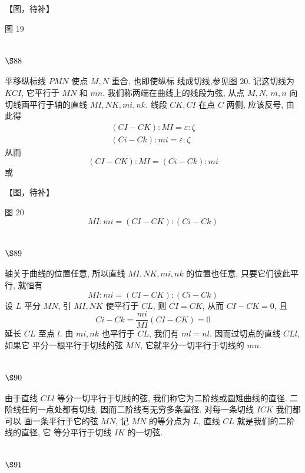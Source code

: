 【图，待补】

图 19

\section{$\S 88$}

平移纵标线 $P M N$ 使点 $M, N$ 重合, 也即使纵标 线成切线,参见图 20. 记这切线为 $K C I$, 它平行于 $M N$ 和 $m n$. 我们称两端在曲线上的线段为弦, 从点 $M, N$, $m, n$ 向切线画平行于轴的直线 $M I, N K, m i, n k$. 线段 $C K, C I$ 在点 $C$ 两侧, 应该反号, 由此得
\[
\begin{gathered}
(C I-C K): M I=\varepsilon: \zeta \\
(C i-C k): m i=\varepsilon: \zeta
\end{gathered}
\]
从而
\[
(C I-C K): M I=(C i-C k): m i
\]
或


【图，待补】

图 20
\[
M I: m i=(C I-C K):(C i-C k)
\]
\section{$\S 89$}

轴关于曲线的位置任意, 所以直线 $M I, N K, m i, n k$ 的位置也任意, 只要它们彼此平 行, 就恒有
\[
M I: m i=(C I-C K):(C i-C k)
\]
设 $L$ 平分 $M N$, 引 $M I, N K$ 使平行于 $C L$, 则 $C I=C K$, 从而 $C I-C K=0$, 且
\[
C i-C k=\frac{m i}{M I}(C I-C K)=0
\]
延长 $C L$ 至点 $l$. 由 $m i, n k$ 也平行于 $C L$, 我们有 $m l=n l$. 因而过切点的直线 $C L l$, 如果它 平分一根平行于切线的弦 $M N$, 它就平分一切平行于切线的 $m n$. 

\section{$\S 90$}

由于直线 $C L l$ 等分一切平行于切线的弦, 我们称它为二阶线或圆雉曲线的直径. 二 阶线任何一点处都有切线, 因而二阶线有无穷多条直径. 对每一条切线 $I C K$ 我们都可以 画一条平行于它的弦 $M N$, 记 $M N$ 的等分点为 $L$, 直线 $C L$ 就是我们的二阶线的直径, 它 等分平行于切线 $I K$ 的一切弦.

\section{$\S 91$}

